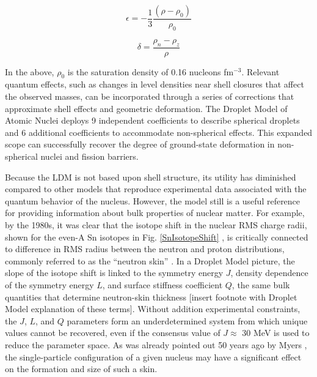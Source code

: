 \begin{equation}
    \epsilon = -\frac{1}{3}\frac{(\rho - \rho_{0})}{\rho_{0}}
\end{equation}

\begin{equation}
    \delta = \frac{\rho_{n}-\rho_{z}}{\rho}
\end{equation}

\noindent
In the above, $\rho_{0}$ is the saturation density of 0.16 nucleons fm$^{-3}$. Relevant quantum
effects, such as changes in level densities near shell closures
that affect the observed masses, can be incorporated through a series of corrections
that approximate shell effects and geometric deformation.
The Droplet Model of Atomic Nuclei deploys 9 
independent coefficients to describe spherical droplets and 6 additional
coefficients to accommodate non-spherical effects. This expanded scope
can successfully recover the degree of ground-state deformation in non-spherical
nuclei and fission barriers.

Because the LDM is not based upon shell structure, its utility has diminished
compared to other models that reproduce experimental data associated with the quantum
behavior of the nucleus. However, the model still is a useful reference for providing 
information about bulk properties of nuclear matter. For example, by the 1980s,
it was clear that the isotope shift in the nuclear RMS
charge radii, shown for the even-A Sn isotopes in Fig.
\ref{SnIsotopeShift} \cite{Anselment1986},
is critically connected to difference in RMS radius 
between the neutron and proton distributions, commonly referred to as the
``neutron skin'' \cite{Otten1989}.
In a Droplet Model picture, the slope of the isotope shift is linked to the symmetry energy $J$, 
density dependence of the symmetry energy
$L$, and surface stiffness coefficient $Q$, the same bulk quantities that determine
neutron-skin thickness \cite{MyersAndSwiatecki, Berdichevsky1988}
[insert footnote with Droplet Model explanation of these terms].
Without addition experimental constraints, the $J$, $L$, and $Q$ parameters form an
underdetermined system from which unique values cannot be recovered, even if the
consensus value of $J \approx$ 30 MeV is used to reduce the parameter space.
As was already pointed out 50 years ago by Myers \cite{Myers1969},
the single-particle configuration of a given nucleus may have a significant
effect on the formation and size of such a skin.

